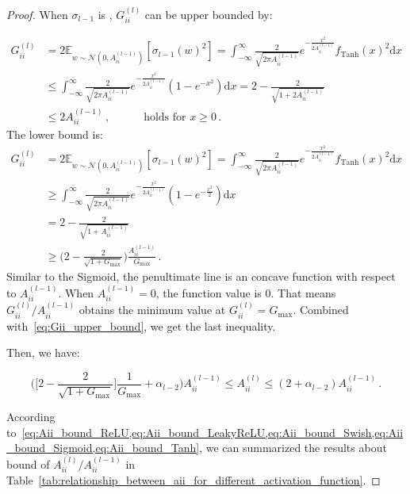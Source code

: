 \documentclass[nohyperref]{article}
\theoremstyle{plain}
\theoremstyle{definition}
\theoremstyle{remark}
\begin{document}
\begin{proof}
When $\sigma_{l-1}$ is , $G_{ii}^{(l)}$ can be upper bounded by:

\begin{equation}
\begin{split}
    G_{ii}^{(l)}&=2\mathbb{E}_{w \sim \mathcal N(0,A_{ii}^{(l-1)})}[\sigma_{l-1}(w)^2] =\int_{-\infty}^{\infty}\frac{2}{\sqrt{2\pi A_{ii}^{(l-1)}}}e^{-\frac{x^2}{2A_{ii}^{(l-1)}}}f_{\mathrm{Tanh}}(x)^2 \mathrm{d}x\\
    & \leq \int_{-\infty}^{\infty}\frac{2}{\sqrt{2\pi A_{ii}^{(l-1)}}}e^{-\frac{x^2}{2A_{ii}^{(l-1)}}}(1 - e^{-x^2})\mathrm{d}x = 2-\frac{2}{\sqrt{1+2A_{ii}^{(l-1)}}}\\
    & \leq 2A_{ii}^{(l-1)}\,, \quad\quad\quad\text{holds for $x \geq 0$}\,.
\end{split}
\label{eq:Gii_upper_bound_Tanh_2}
\end{equation}
The lower bound is:
\begin{equation}
\begin{split}
    G_{ii}^{(l)}&=2\mathbb{E}_{w \sim \mathcal N(0,A_{ii}^{(l-1)})}[\sigma_{l-1}(w)^2] =\int_{-\infty}^{\infty}\frac{2}{\sqrt{2\pi A_{ii}^{(l-1)}}}e^{-\frac{x^2}{2A_{ii}^{(l-1)}}}f_{\mathrm{Tanh}}(x)^2 \mathrm{d}x\\
    & \geq \int_{-\infty}^{\infty}\frac{2}{\sqrt{2\pi A_{ii}^{(l-1)}}}e^{-\frac{x^2}{2A_{ii}^{(l-1)}}}(1 - e^{-\frac{x^2}{2}})\mathrm{d}x\\
    & = 2-\frac{2}{\sqrt{1+A_{ii}^{(l-1)}}}\\
    & \geq\bigg(2-\frac{2}{\sqrt{1+G_{\max}}}\bigg)\frac{A_{ii}^{(l-1)}}{G_{\max}}\,.
    \end{split}
\label{eq:Gii_lower_bound_Tanh}
\end{equation}
Similar to the Sigmoid, the penultimate line is an concave function with respect to $A_{ii}^{(l-1)}$. When $A_{ii}^{(l-1)}=0$, the function value is 0. That means $G_{ii}^{(l)}/A_{ii}^{(l-1)}$ obtains the minimum value at $G_{ii}^{(l)} = G_{\max}$. Combined with~\cref{eq:Gii_upper_bound}, we get the last inequality.


Then, we have:

\begin{equation}
\bigg(\bigg[2-\frac{2}{\sqrt{1+G_{\max}}}\bigg]\frac{1}{G_{\max}}+\alpha_{l-2}\bigg)A_{ii}^{(l-1)} \leq A_{ii}^{(l)}\leq (2+\alpha_{l-2})A_{ii}^{(l-1)}\,.
\label{eq:Aii_bound_Tanh}
\end{equation}


According to~\cref{eq:Aii_bound_ReLU,eq:Aii_bound_LeakyReLU,eq:Aii_bound_Swish,eq:Aii_bound_Sigmoid,eq:Aii_bound_Tanh}, we can summarized the results about bound of $A_{ii}^{(l)}/A_{ii}^{(l-1)}$ in Table~\ref{tab:relationship_between_aii_for_different_activation_function}.


\end{proof}
\end{document}
